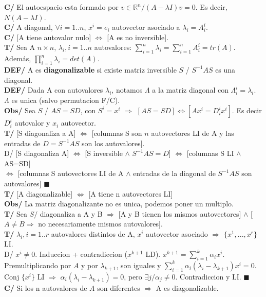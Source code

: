 \documentclass[10pt,a4paper]{article}
\newcommand*{\QEDA}{\null\nobreak\hfill\ensuremath{\blacksquare}}
\begin{document}
\textbf{C/} El autoespacio esta formado por $v \in \mathbb{R}^n / (A-\lambda I)v = 0$. Es decir, $N(A-\lambda I)$.\\
\textbf{C/} A diagonal, $\forall i=1..n$, $x^i = e_i$ autovector asociado a $\lambda_i = A^i_i$.\\
\textbf{C/} [A tiene autovalor nulo] $\iff$ [A es no inversible].\\
\textbf{T/} Sea A $n \times n$, $\lambda_i, i=1..n$ autovalores: $\sum_{i=1}^n \lambda_i = \sum_{i=1}^n A_i^i = tr(A)$. Adem\'as, $\prod_{i=1}^n\lambda_i = det(A)$.\\
\textbf{DEF/} A es \textbf{diagonalizable} si existe matriz inversible $S$ / $S^{-1}AS$ es una diagonal.\\
\textbf{DEF/} Dada A con autovalores $\lambda_i$, notamos $\Lambda$ a la matriz diagonal con $\Lambda_i^i = \lambda_i$. $\Lambda$ es unica (salvo permutacion F/C).\\
\textbf{Obs/} Sea $S$ / $AS=SD$, con $S^i=x^i$ $\Rightarrow$ $[AS=SD] \iff [Ax^i=D_i^ix^i]$. Es decir $D_i^i$ autovalor y $x_i$ autovector.\\
\textbf{T/} [S diagonaliza a A] $\iff$ [columnas S son $n$ autovectores LI de A y las entradas de $D=S^{-1}AS$ son los autovalores].\\
D/ [S diagonaliza A] $\iff$ [S inversible $\land$ $S^{-1}AS=D$] $\iff$ [columnas S LI $\land$ AS=SD]\\ $\iff$ [columnas S autovectores LI de A $\land$ entradas de la diagonal de $S^{-1}AS$ son autovalores] \QEDA\\
\textbf{T/} [A diagonalizable] $\iff$ [A tiene n autovectores LI]\\
\textbf{Obs/} La matriz diagonalizante no es unica, podemos poner un multiplo.\\
\textbf{T/} Sea $S/$ diagonaliza a A y B $\Rightarrow$ [A y B tienen los mismos autovectores] $\land$ [$A \not = B \Rightarrow$ no necesariamente mismos autovalores].\\
\textbf{T/} $\lambda_i, i=1..r$ autovalores distintos de A, $x^i$ autovector asociado $\Rightarrow$ $\{x^1,...,x^r\}$ LI.\\
D/ $x^i \not = 0$. Induccion + contradiccion ($x^{k+1}$ LD). $x^{k+1} = \sum_{i=1}^k \alpha_ix^i$. Premultiplicando por $A$ y por $\lambda_{k+1}$, son iguales y $\sum_{i=1}^k \alpha_i (\lambda_i - \lambda_{k+1}) x^i = 0$. Conj $\{x^i\}$ LI $\Rightarrow$ $\alpha_i(\lambda_i - \lambda_{k+1}) = 0$, pero $\exists j / \alpha_j \not = 0$. Contradiccion y LI. \QEDA\\
\textbf{C/} Si los n autovalores de $A$ son diferentes $\Rightarrow$ A es diagonalizable.
\end{document}
